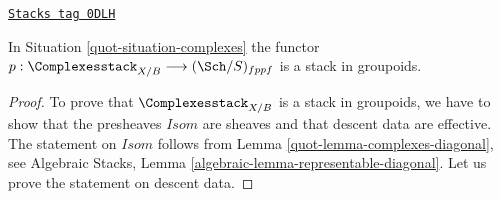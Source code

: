 \begin{lemma}
\label{quot-lemma-complexes-stack}
\href{https://stacks.math.columbia.edu/tag/0DLH}{\texttt{Stacks tag 0DLH}}

In Situation \ref{quot-situation-complexes} the functor
$p : \Complexesstack_{X/B} \longrightarrow (\Sch/S)_{fppf}$
is a stack in groupoids.
\end{lemma}

\begin{proof}

To prove that $\Complexesstack_{X/B}$ is a stack in groupoids,
we have to show that the presheaves $\mathit{Isom}$ are sheaves
and that descent data are effective. The statement on
$\mathit{Isom}$ follows from Lemma \ref{quot-lemma-complexes-diagonal}, see
Algebraic Stacks, Lemma \ref{algebraic-lemma-representable-diagonal}.
Let us prove the statement on descent data.


\end{proof}
